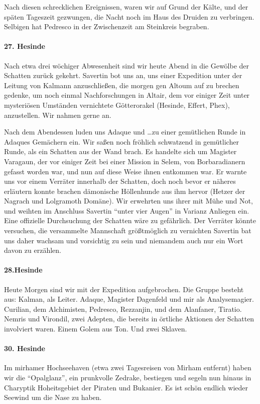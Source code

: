 Nach diesen schrecklichen Ereignissen, waren wir auf Grund der Kälte, und der späten Tageszeit gezwungen, die Nacht noch im Haus des Druiden zu verbringen. Selbigen hat Pedresco in der Zwischenzeit am Steinkreis begraben.

\paragraph{27. Hesinde}
Nach etwa drei wöchiger Abwesenheit sind wir heute Abend in die Gewölbe der Schatten zurück gekehrt. Savertin bot uns an, uns einer Expedition unter der Leitung von Kalmann anzuschließen, die morgen gen Altoum auf zu brechen gedenke, um noch einmal Nachforschungen in Altair, dem vor einiger Zeit unter mysteriösen Umständen vernichtete Götterorakel (Hesinde, Effert, Phex), anzustellen. Wir nahmen gerne an.

Nach dem Abendessen luden uns Adaque und \dots zu einer gemütlichen Runde in Adaques Gemächern ein. Wir saßen noch fröhlich schwatzend in gemütlicher Runde, als ein Schatten aus der Wand brach. Es handelte sich um Magister Varagaun, der vor einiger Zeit bei einer Mission in Selem, von Borbaradianern gefasst worden war, und nun auf diese Weise ihnen entkommen war. Er warnte uns vor einem Verräter innerhalb der Schatten, doch noch bevor er näheres erläutern konnte brachen dämonische Höllenhunde aus ihm hervor (Hetzer der Nagrach und Lolgramoth Domäne). Wir erwehrten uns ihrer mit Mühe und Not, und weihten im Anschluss Savertin ``unter vier Augen'' in Varianz Anliegen ein. Eine offizielle Durchsuchung der Schatten wäre zu gefährlich. Der Verräter könnte versuchen, die versammelte Mannschaft größtmöglich zu vernichten Savertin bat uns daher wachsam und vorsichtig zu sein und niemandem auch nur ein Wort davon zu erzählen.

\paragraph{28.Hesinde}
Heute Morgen sind wir mit der Expedition aufgebrochen.
Die Gruppe besteht aus:
Kalman, als Leiter. Adaque, Magister Dagenfeld und mir als Analysemagier. Curilian, dem Alchimisten, Pedresco, Rezzanjin, und dem Alanfaner, Tiratio. Nemris und Virondil, zwei Adepten, die bereits in örtliche Aktionen der Schatten involviert waren. Einem Golem aus Ton. Und zwei Sklaven.

\paragraph{30. Hesinde}
Im mirhamer Hochseehaven (etwa zwei Tagesreisen von Mirham entfernt) haben wir die ``Opalglanz'', ein prunkvolle Zedrake, bestiegen und segeln nun hinaus in Charyptik Hoheitsgebiet der Piraten und Bukanier. Es ist schön endlich wieder Seewind um die Nase zu haben.


